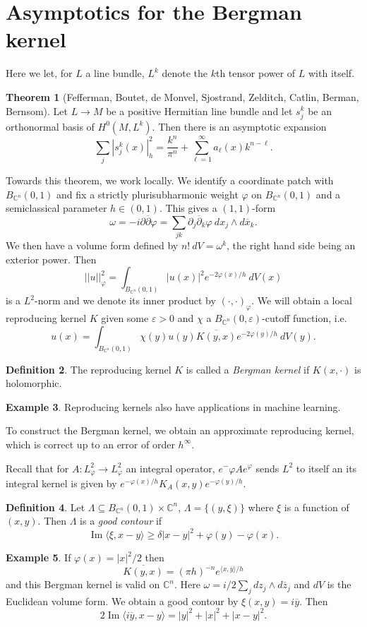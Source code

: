 \documentclass[12pt]{report}
\newcommand{\CC}{\mathbb{C}}
\newcommand{\dbar}{\overline \partial}
\renewcommand{\Im}{\operatorname{Im}}
\newcommand{\dfn}[1]{\emph{#1}\index{#1}}
\theoremstyle{definition}
\newtheorem{theorem}{Theorem}[chapter]
\newtheorem{definition}[theorem]{Definition}
\newtheorem{example}[theorem]{Example}
\begin{document}
\section{Asymptotics for the Bergman kernel}
    Here we let, for $L$ a line bundle, $L^k$ denote the $k$th tensor power of $L$ with itself.
\begin{theorem}[Fefferman, Boutet, de Monvel, Sjostrand, Zelditch, Catlin, Berman, Bernsom]
    Let $L \to M$ be a positive Hermitian line bundle and let $s_j^k$ be an orthonormal basis of $H^0(M, L^k)$. Then there is an asymptotic expansion
    $$\sum_j |s_j^k(x)|^2_h = \frac{k^n}{\pi^n} + \sum_{\ell=1}^\infty a_\ell(x)k^{n-\ell}.$$
\end{theorem}
    Towards this theorem, we work locally. We identify a coordinate patch with $B_{\CC^n}(0, 1)$ and fix a strictly plurisubharmonic weight $\varphi$ on $B_{\CC^n}(0, 1)$ and a semiclassical parameter $h \in (0, 1)$. This gives a $(1, 1)$-form
    $$\omega = -i\partial\dbar\varphi = \sum_{jk} \partial_j \dbar_k \varphi ~dx_j \wedge d\overline x_k.$$
    We then have a volume form defined by $n! ~dV = \omega^k$, the right hand side being an exterior power. Then
    $$||u||_\varphi^2 = \int_{B_{\CC^n}(0, 1)} |u(x)|^2 e^{-2\varphi(x)/h} ~dV(x)$$
    is a $L^2$-norm and we denote its inner product by $(\cdot,\cdot)_\varphi$. We will obtain a local reproducing kernel $K$ given some $\varepsilon > 0$ and $\chi$ a $B_{\CC^n}(0, \varepsilon)$-cutoff function, i.e.
    $$u(x) = \int_{B_{\CC^n}(0, 1)} \chi(y)u(y) \overline{K(y, x)} e^{-2\varphi(y)/h} ~dV(y).$$
\begin{definition}
    The reproducing kernel $K$ is called a \dfn{Bergman kernel} if $K(x, \cdot)$ is holomorphic.
\end{definition}
\begin{example}
    Reproducing kernels also have applications in machine learning.
\end{example}
    To construct the Bergman kernel, we obtain an approximate reproducing kernel, which is correct up to an error of order $h^\infty$. 

    Recall that for $A: L^2_\varphi \to L^2_\varphi$ an integral operator, $e^-\varphi A e^\varphi$ sends $L^2$ to itself an its integral kernel is given by $e^{-\varphi(x)/h} K_A(x, y) e^{-\varphi(y)/h}$. 

\begin{definition}
    Let $\Lambda \subseteq B_{\CC^n}(0, 1) \times \CC^n$, $\Lambda = \{(y, \xi)\}$ where $\xi$ is a function of $(x, y)$. Then $\Lambda$ is a \dfn{good contour} if
    $$\Im \langle \xi, x - y\rangle \geq \delta|x - y|^2 + \varphi(y) - \varphi(x).$$
\end{definition}
\begin{example}
    If $\varphi(x) = |x|^2/2$ then
    $$\overline{K(y, x)} = (\pi h)^{-n} e^{\langle x, \overline y\rangle/h}$$
    and this Bergman kernel is valid on $\CC^n$. Here $\omega = i/2\sum_j dz_j \wedge d\overline z_j$ and $dV$ is the Euclidean volume form. We obtain a good contour by $\xi(x, y) = i\overline y$. Then
    $$2\Im \langle i\overline y, x - y\rangle = |y|^2 + |x|^2 + |x - y|^2.$$
\end{example}
    
\end{document}
